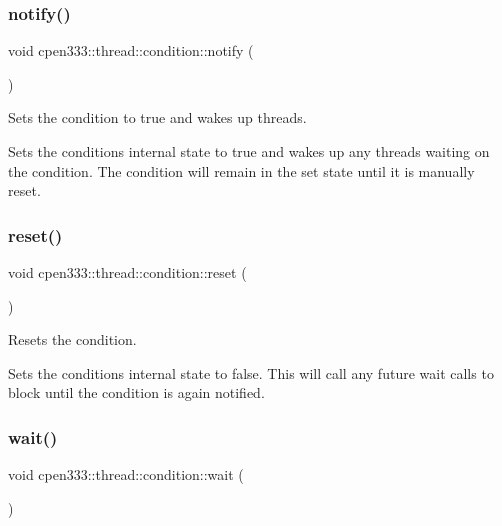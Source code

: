 \subsubsection{\texorpdfstring{notify()}{notify()}}
{\footnotesize\ttfamily void cpen333\+::thread\+::condition\+::notify (\begin{DoxyParamCaption}{ }\end{DoxyParamCaption})\hspace{0.3cm}{\ttfamily [inline]}}



Sets the condition to {\ttfamily true} and wakes up threads. 

Sets the condition\textquotesingle{}s internal state to {\ttfamily true} and wakes up any threads waiting on the condition. The condition will remain in the {\ttfamily set} state until it is manually reset. \mbox{\label{classcpen333_1_1thread_1_1condition_a99e8696703e31632cccc1d17b0b18d2f}} 
\subsubsection{\texorpdfstring{reset()}{reset()}}
{\footnotesize\ttfamily void cpen333\+::thread\+::condition\+::reset (\begin{DoxyParamCaption}{ }\end{DoxyParamCaption})\hspace{0.3cm}{\ttfamily [inline]}}



Resets the condition. 

Sets the condition\textquotesingle{}s internal state to {\ttfamily false}. This will call any future {\ttfamily wait} calls to block until the condition is again notified. \mbox{\label{classcpen333_1_1thread_1_1condition_a8f04e3bd62b29535f8a98ded4efafea2}} 
\subsubsection{\texorpdfstring{wait()}{wait()}}
{\footnotesize\ttfamily void cpen333\+::thread\+::condition\+::wait (\begin{DoxyParamCaption}{ }\end{DoxyParamCaption})\hspace{0.3cm}{\ttfamily [inline]}}



